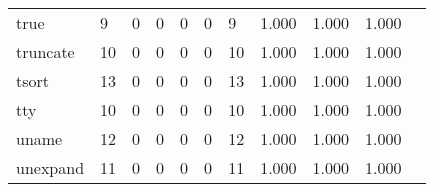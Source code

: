 \begin{longtable}{lp{1.20cm}p{1.20cm}p{1.20cm}p{1.20cm}p{1.20cm}p{1.20cm}p{1.20cm}p{1.20cm}p{1.20cm}p{1.20cm}}
true      &                                     9 &                                                  0 &                                                  0 &                                                  0 &                                                  0 &                                                  9 &                                         1.000 &                                              1.000 &                                              1.000 \\
truncate  &                                    10 &                                                  0 &                                                  0 &                                                  0 &                                                  0 &                                                 10 &                                         1.000 &                                              1.000 &                                              1.000 \\
tsort     &                                    13 &                                                  0 &                                                  0 &                                                  0 &                                                  0 &                                                 13 &                                         1.000 &                                              1.000 &                                              1.000 \\
tty       &                                    10 &                                                  0 &                                                  0 &                                                  0 &                                                  0 &                                                 10 &                                         1.000 &                                              1.000 &                                              1.000 \\
uname     &                                    12 &                                                  0 &                                                  0 &                                                  0 &                                                  0 &                                                 12 &                                         1.000 &                                              1.000 &                                              1.000 \\
unexpand  &                                    11 &                                                  0 &                                                  0 &                                                  0 &                                                  0 &                                                 11 &                                         1.000 &                                              1.000 &                                              1.000 \\

\end{longtable}
